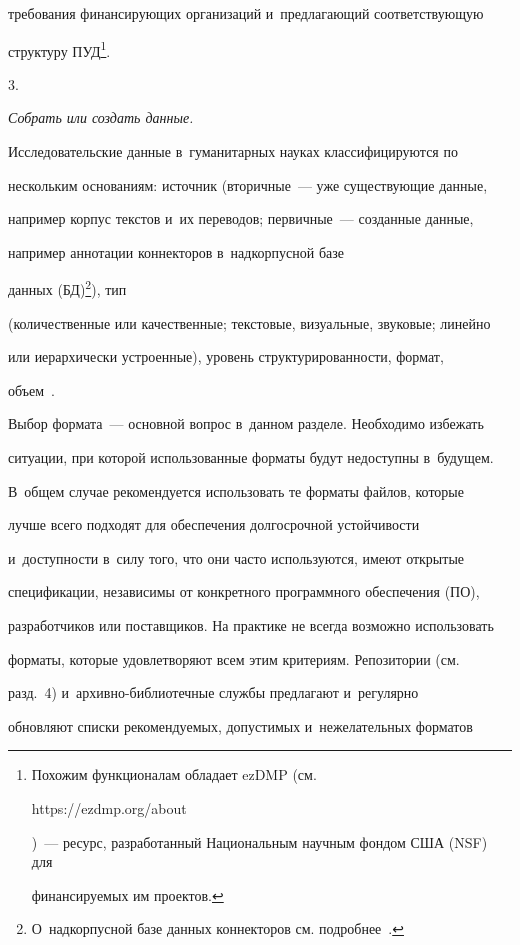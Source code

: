 требования финансирующих организаций и~предлагающий соответствующую 

структуру ПУД\footnote{Похожим функционалам обладает ezDMP (см.\ {\sf  

https://ezdmp.org/about})~--- ресурс, разработанный Национальным научным фондом США (NSF) для 

финансируемых им проектов.}.

  

  3.

\textit{Собрать или создать данные.}

  

  Исследовательские данные в~гуманитарных науках классифицируются по 

нескольким основаниям: источник (вторичные~--- уже существующие данные, 

например корпус текстов и~их переводов; первичные~--- созданные данные, 

например аннотации коннекторов в~надкорпусной базе 

данных (БД)\footnote{О~надкорпусной базе данных коннекторов см. подробнее~\cite{17-nur}.}), тип 

(количественные или качественные; текстовые, визуальные, звуковые; линейно 

или иерархически устроенные), уровень структурированности, формат, 

объем~\cite{14-nur}.

  

  Выбор формата~--- основной вопрос в~данном разделе. Необходимо избежать 

ситуации, при которой использованные форматы будут недоступны в~будущем. 

В~общем случае рекомендуется использовать те форматы файлов, которые 

лучше всего подходят для обеспечения долгосрочной устойчивости 

и~доступности в~силу того, что они часто используются, имеют открытые 

спецификации, независимы от конкретного программного обеспечения (ПО), 

разработчиков или поставщиков. На практике не всегда возможно использовать 

форматы, которые удовлетворяют всем этим критериям. Репозитории (см.\ 

разд.~4) и~ар\-хив\-но-биб\-лио\-теч\-ные службы предлагают и~регулярно 

обновляют списки рекомендуемых, допустимых и~нежелательных форматов 

